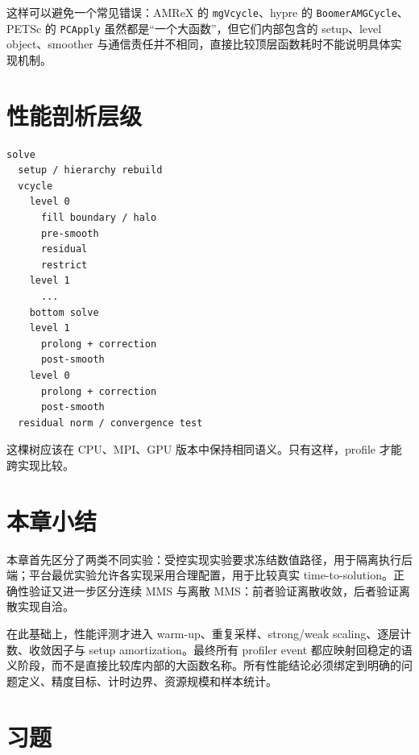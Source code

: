 这样可以避免一个常见错误：AMReX 的 \texttt{mgVcycle}、hypre 的 \texttt{BoomerAMGCycle}、PETSc 的 \texttt{PCApply} 虽然都是“一个大函数”，但它们内部包含的 setup、level object、smoother 与通信责任并不相同，直接比较顶层函数耗时不能说明具体实现机制。

\section{性能剖析层级}
\label{sec:setup-solve}

\begin{verbatim}
solve
  setup / hierarchy rebuild
  vcycle
    level 0
      fill boundary / halo
      pre-smooth
      residual
      restrict
    level 1
      ...
    bottom solve
    level 1
      prolong + correction
      post-smooth
    level 0
      prolong + correction
      post-smooth
  residual norm / convergence test
\end{verbatim}

这棵树应该在 CPU、MPI、GPU 版本中保持相同语义。只有这样，profile 才能跨实现比较。

\section{本章小结}
本章首先区分了两类不同实验：受控实现实验要求冻结数值路径，用于隔离执行后端；平台最优实验允许各实现采用合理配置，用于比较真实 time-to-solution。正确性验证又进一步区分连续 MMS 与离散 MMS：前者验证离散收敛，后者验证离散实现自洽。

在此基础上，性能评测才进入 warm-up、重复采样、strong/weak scaling、逐层计数、收敛因子与 setup amortization。最终所有 profiler event 都应映射回稳定的语义阶段，而不是直接比较库内部的大函数名称。所有性能结论必须绑定到明确的问题定义、精度目标、计时边界、资源规模和样本统计。

\section*{习题}

